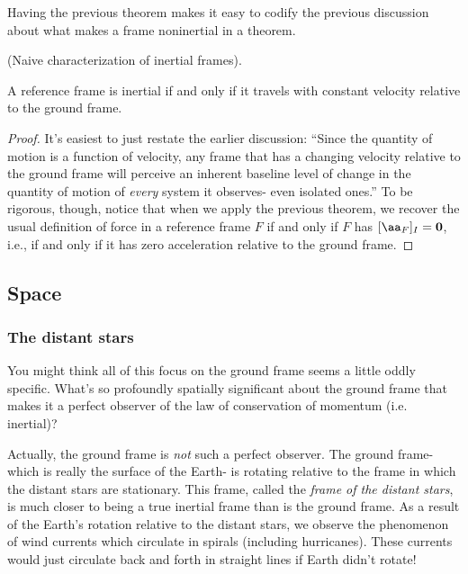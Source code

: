 \documentclass{article}
\begin{document}
Having the previous theorem makes it easy to codify the previous discussion about what makes a frame noninertial in a theorem.

\begin{theorem}
	(Naive characterization of inertial frames).
	
	A reference frame is inertial if and only if it travels with constant velocity relative to the ground frame.
\end{theorem}

\begin{proof}
	It's easiest to just restate the earlier discussion: ``Since the quantity of motion is a function of velocity, any frame that has a changing velocity relative to the ground frame will perceive an inherent baseline level of change in the quantity of motion of \textit{every} system it observes- even isolated ones.'' To be rigorous, though, notice that when we apply the previous theorem, we recover the usual definition of force in a reference frame $F$ if and only if $F$ has $[\aa_F]_I = \mathbf{0}$, i.e., if and only if it has zero acceleration relative to the ground frame. 
\end{proof}

\newpage

\subsection*{Space}

\subsubsection*{The distant stars}

You might think all of this focus on the ground frame seems a little oddly specific. What's so profoundly spatially significant about the ground frame that makes it a perfect observer of the law of conservation of momentum (i.e. inertial)?

Actually, the ground frame is \textit{not} such a perfect observer. The ground frame- which is really the surface of the Earth- is rotating relative to the frame in which the distant stars are stationary. This frame, called the \textit{frame of the distant stars}, is much closer to being a true inertial frame than is the ground frame. As a result of the Earth's rotation relative to the distant stars, we observe the phenomenon of wind currents which circulate in spirals (including hurricanes). These currents would just circulate back and forth in straight lines if Earth didn't rotate! 
\end{document}
